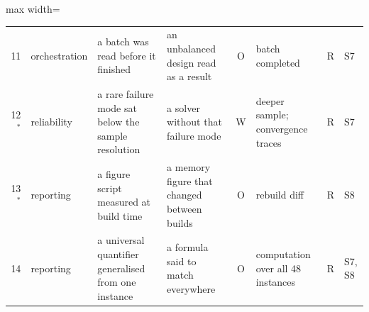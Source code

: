 \begin{table}[t]
\begin{adjustbox}{max width=\textwidth}
\begin{tabular}{@{}r l p{45mm} p{37mm} c p{30mm} c l@{}}
11 & orchestration & a batch was read before it finished & an unbalanced design read as a result & O & batch completed & R & S7 \\
12$^{*}$ & reliability & a rare failure mode sat below the sample resolution & a solver without that failure mode & W & deeper sample; convergence traces & R & S7 \\
13$^{*}$ & reporting & a figure script measured at build time & a memory figure that changed between builds & O & rebuild diff & R & S8 \\
14 & reporting & a universal quantifier generalised from one instance & a formula said to match everywhere & O & computation over all 48 instances & R & S7, S8 \\
\bottomrule
\end{tabular}
\end{adjustbox}
\end{table}
